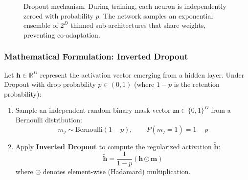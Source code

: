 \begin{figure}[htbp]
\caption{Dropout mechanism. During training, each neuron is independently zeroed with probability $p$. The network samples an exponential ensemble of $2^D$ thinned sub-architectures that share weights, preventing co-adaptation.}\label{fig:dropout_concept}
\end{figure}

\subsubsection{Mathematical Formulation: Inverted Dropout}

Let $\mathbf{h} \in \mathbb{R}^D$ represent the activation vector emerging from a hidden layer. Under Dropout with drop probability $p \in (0, 1)$ (where $1 - p$ is the retention probability):
\begin{enumerate}
    \item Sample an independent random binary mask vector $\mathbf{m} \in \{0, 1\}^D$ from a Bernoulli distribution:
    \begin{equation}
    m_j \sim \text{Bernoulli}(1 - p), \qquad P(m_j = 1) = 1 - p\label{eq:bernoulli_mask}
    \end{equation}
    \item Apply \textbf{Inverted Dropout} to compute the regularized activation $\tilde{\mathbf{h}}$:
    \begin{equation}
    \tilde{\mathbf{h}} = \frac{1}{1 - p} \left( \mathbf{h} \odot \mathbf{m} \right)\label{eq:inverted_dropout}
    \end{equation}
    where $\odot$ denotes element-wise (Hadamard) multiplication.
\end{enumerate}

